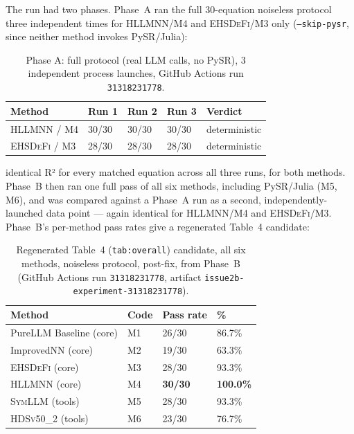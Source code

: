 \documentclass[twoside,11pt]{article}
\newcommand{\EHD}{\textsc{EHSDeFi}}
\newcommand{\HSL}{\textsc{HLLMNN}}
\newcommand{\SEL}{\textsc{SymLLM}}
\newcommand{\HDS}{\textsc{HDSv50\_2}}
\newcommand{\ok}{{\color{passgreen}\textbf{\checkmark}}}
\begin{document}
The run had two phases. Phase~A ran the full 30-equation noiseless
protocol three independent times for \HSL{}/M4 and \EHD{}/M3 only
(\texttt{--skip-pysr}, since neither method invokes PySR/Julia):

\begin{table}[h]
\centering
\caption{Phase A: full protocol (real LLM calls, no PySR), 3
  independent process launches, GitHub Actions run \texttt{31318231778}.}
\label{tab:2b-fullstack}
\small
\begin{tabular}{L{5.6cm} C{2.0cm}C{2.0cm}C{2.0cm}L{2.4cm}}
\toprule
\textbf{Method} & \textbf{Run 1} & \textbf{Run 2} & \textbf{Run 3} & \textbf{Verdict} \\
\midrule
\HSL{} / M4 & 30/30 & 30/30 & 30/30 & \ok{} deterministic \\
\EHD{} / M3 & 28/30 & 28/30 & 28/30 & \ok{} deterministic \\
\bottomrule
\end{tabular}
\end{table}

\noindent identical R² for every matched equation across all three
runs, for both methods. Phase~B then ran one full pass of all six
methods, including PySR/Julia (M5, M6), and was compared against a
Phase~A run as a second, independently-launched data point --- again
identical for \HSL{}/M4 and \EHD{}/M3. Phase~B's per-method pass rates
give a regenerated Table~4 candidate:

\begin{table}[h]
\centering
\caption{Regenerated Table~4 (\texttt{tab:overall}) candidate, all six
  methods, noiseless protocol, post-fix, from Phase~B
  (GitHub Actions run \texttt{31318231778}, artifact
  \texttt{issue2b-experiment-31318231778}).}
\label{tab:table4-regen}
\small
\begin{tabular}{L{5.6cm} C{1.2cm} C{2.0cm} C{2.4cm}}
\toprule
\textbf{Method} & \textbf{Code} & \textbf{Pass rate} & \textbf{\%} \\
\midrule
PureLLM Baseline (core) & M1 & 26/30 & 86.7\% \\
ImprovedNN (core) & M2 & 19/30 & 63.3\% \\
\EHD{} (core) & M3 & 28/30 & 93.3\% \\
\HSL{} (core) & M4 & \textbf{30/30} & \textbf{100.0\%} \\
\SEL{} (tools) & M5 & 28/30 & 93.3\% \\
\HDS{} (tools) & M6 & 23/30 & 76.7\% \\
\bottomrule
\end{tabular}
\end{table}
\end{document}
